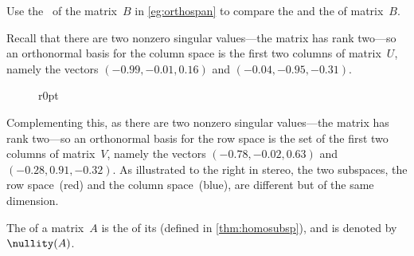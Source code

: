 \begin{example} 
Use the \svd\ of the matrix~\(B\) in \cref{eg:orthospan} to compare the  and the  of matrix~\(B\).

\begin{solution} 
Recall that there are two nonzero singular values---the matrix has rank two---so an orthonormal basis for the column space is  the first two columns of matrix~\(U\), namely the vectors  \((-0.99,-0.01,0.16)\) and \((-0.04,-0.95,-0.31)\).

\begin{figure}r{0pt}
\end{figure}
Complementing this, as there are two nonzero singular values---the matrix has rank two---so an orthonormal basis for the row space is the set of the first two columns of matrix~\(V\), namely the vectors  \((-0.78,-0.02, 0.63)\) and \((-0.28, 0.91,-0.32)\).
As illustrated to the right in stereo, the two subspaces, the row space~(red) and the column space~(blue), are different but of the same dimension.
\aqed

\end{solution}
\end{example}




\begin{definition} \label{def:nullity} 
The  of a matrix~\(A\) is the  of its  (defined in \cref{thm:homosubsp}), and is denoted by \(\nullity(A)\).
\end{definition}

